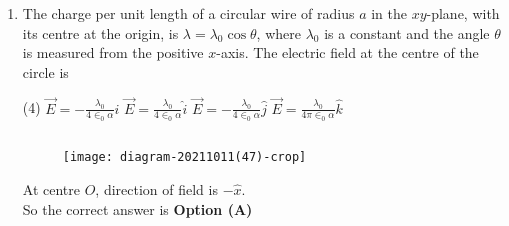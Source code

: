 \begin{enumerate}[label=\color{ocre}\textbf{\arabic*.}]
\begin{figure}[H]
\centering
\texttt{[image: diagram-20211011(43)-crop]}
\end{figure}
\begin{tasks}(4)
\task[\textbf{A.}]$\frac{\rho R}{3 \varepsilon_{0}} \hat{n}$
\task[\textbf{B.}] $\frac{\rho R}{3 \varepsilon_{0} a}(\vec{r}-\hat{n} a)$
\task[\textbf{C.}] $\frac{\rho R}{6 \varepsilon_{0}} \hat{n}$
\task[\textbf{D.}] $\frac{\rho a}{3 \varepsilon_{0} R} \vec{r}$ 
\end{tasks}
\begin{answer}$\left. \right. $
\begin{figure}[H]
	\centering
	\texttt{[image: diagram-20211011(44)-crop]}
\end{figure}
\begin{align*}
\text{Electric field at $P$ due to $S_{1}$ is }\vec{E}_{1}&=\frac{\rho}{3 \varepsilon_{0}} \vec{r}_{+}
\intertext{Electric field at $P$ due to $S_{2}$ (assume $\left.-\rho\right)$ is $\vec{E}_{2}=\frac{-\rho}{3 \varepsilon_{0}} \vec{r}_{-}$}
\text{Thus }\vec{E}&=\vec{E}_{1}+\vec{E}_{2}=\frac{\rho}{3 \varepsilon_{0}}\left(\vec{r}_{+}-\vec{r}_{-}\right) ; \\ \because \vec{b}+\vec{r}_{-}&=\vec{r}_{+} \Rightarrow \vec{r}_{+}-\vec{r}=\vec{b}\\
\vec{E}&=\frac{\rho}{3 \varepsilon_{0}} \vec{b}=\frac{\rho R}{6 \varepsilon_{0}} \hat{n}\left(\because \vec{b}=\frac{R}{2} \hat{n}\right)
\end{align*}
So the correct answer is \textbf{Option (C)}
\end{answer}
\item  The charge per unit length of a circular wire of radius $a$ in the $x y$-plane, with its centre at the origin, is $\lambda=\lambda_{0} \cos \theta$, where $\lambda_{0}$ is a constant and the angle $\theta$ is measured from the positive $x$-axis. The electric field at the centre of the circle is
{}

\begin{tasks}(4)
\task[\textbf{A.}] $\vec{E}=-\frac{\lambda_{0}}{4 \in_{0} \alpha} \hat{i}$
\task[\textbf{B.}] $\vec{E}=\frac{\lambda_{0}}{4 \in_{0} \alpha} \hat{i}$
\task[\textbf{C.}] $\vec{E}=-\frac{\lambda_{0}}{4 \in_{0} \alpha} \hat{j}$
\task[\textbf{D.}] $\vec{E}=\frac{\lambda_{0}}{4 \pi \in_{0} \alpha} \hat{k}$
\end{tasks}
\begin{answer}$\left. \right. $\\
\begin{figure}[H]
	\centering
	\texttt{[image: diagram-20211011(47)-crop]}
\end{figure}
At centre $O$, direction of field is $-\hat{x}$.\\
So the correct answer is \textbf{Option (A)}
\end{answer}
\end{enumerate}


